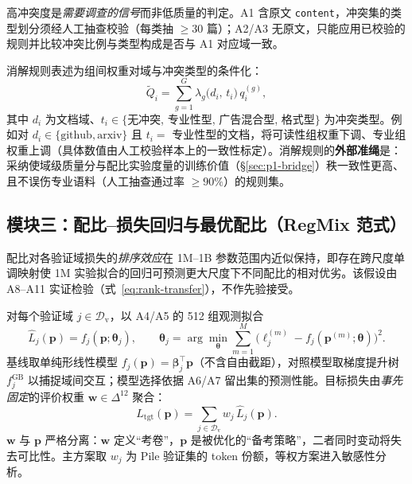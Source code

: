 \begin{remark}
高冲突度是\emph{需要调查的信号}而非低质量的判定。A1 含原文 \texttt{content}，冲突集的类型划分须经人工抽查校验（每类抽 $\ge 30$ 篇）；A2/A3 无原文，只能应用已校验的规则并比较冲突比例与类型构成是否与 A1 对应域一致。
\end{remark}

\begin{definition}[条件化消解算子]\label{def:resolve}
消解规则表述为组间权重对域与冲突类型的条件化：
\begin{equation}
  \widetilde Q_i=\sum_{g=1}^{G}\lambda_g\bigl(d_i,\,t_i\bigr)\,q_i^{(g)},
  \label{eq:resolve}
\end{equation}
其中 $d_i$ 为文档域、$t_i\in\{$无冲突, 专业性型, 广告混合型, 格式型$\}$ 为冲突类型。例如对 $d_i\in\{\text{github},\text{arxiv}\}$ 且 $t_i=$ 专业性型的文档，将可读性组权重下调、专业组权重上调（具体数值由人工校验样本上的一致性标定）。消解规则的\textbf{外部准绳}是：采纳使域级质量分与配比实验度量的训练价值（\S\ref{sec:p1-bridge}）秩一致性更高、且不误伤专业语料（人工抽查通过率 $\ge 90\%$）的规则集。
\end{definition}

\subsection{模块三：配比--损失回归与最优配比（RegMix 范式）}\label{sec:p1-regmix}

\begin{assumption}[小代理可迁移性]\label{asm:transfer}
配比对各验证域损失的\emph{排序效应}在 1M--1B 参数范围内近似保持，即存在跨尺度单调映射使 1M 实验拟合的回归可预测更大尺度下不同配比的相对优劣。该假设由 A8--A11 实证检验（式~\eqref{eq:rank-transfer}），不作先验接受。
\end{assumption}

\begin{definition}[逐域回归与目标损失]\label{def:mix-reg}
对每个验证域 $j\in\mathcal{D}_{\mathrm{v}}$，以 A4/A5 的 512 组观测拟合
\begin{equation}
  \widehat L_j(\bm{p})=f_j(\bm{p};\bm{\theta}_j),\qquad
  \bm{\theta}_j=\arg\min_{\bm{\theta}}
  \sum_{m=1}^{M}\bigl(\ell_j^{(m)}-f_j(\bm{p}^{(m)};\bm{\theta})\bigr)^2 .
  \label{eq:mix-reg}
\end{equation}
基线取单纯形线性模型 $f_j(\bm{p})=\bm{\beta}_j^\top\bm{p}$（不含自由截距），对照模型取梯度提升树 $f_j^{\mathrm{GB}}$ 以捕捉域间交互；模型选择依据 A6/A7 留出集的预测性能。目标损失由\emph{事先固定}的评价权重 $\bm{w}\in\Delta^{12}$ 聚合：
\begin{equation}
  L_{\mathrm{tgt}}(\bm{p})=\sum_{j\in\mathcal{D}_{\mathrm{v}}} w_j\,\widehat L_j(\bm{p}).
  \label{eq:target-loss}
\end{equation}
$\bm{w}$ 与 $\bm{p}$ 严格分离：$\bm{w}$ 定义“考卷”，$\bm{p}$ 是被优化的“备考策略”，二者同时变动将失去可比性。主方案取 $w_j$ 为 Pile 验证集的 token 份额，等权方案进入敏感性分析。
\end{definition}

